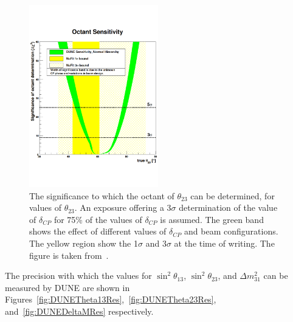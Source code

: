\begin{figure}[h!]
  \centering
  \includegraphics[width=0.5\textwidth]{DUNEOctantDetermination}
  \caption[The significance to which the octant of $\theta_{23}$ can be determined, for values of $\theta_{23}$]
          {The significance to which the octant of $\theta_{23}$ can be determined, for values of $\theta_{23}$. An exposure offering a 3$\sigma$ determination of the value of $\delta_{CP}$ for 75\% of the values of $\delta_{CP}$ is assumed. The green band shows the effect of different values of $\delta_{CP}$ and beam configurations. The yellow region show the 1$\sigma$ and 3$\sigma$ at the time of writing. The figure is taken from~\citep{DUNECDR_V2}.}
  \label{fig:DUNEOctantDetermination}
\end{figure}

The precision with which the values for $\sin^{2}\theta_{13}$, $\sin^{2}\theta_{23}$, and $\Delta m^{2}_{31}$ can be measured by DUNE are shown in Figures~\ref{fig:DUNETheta13Res},~\ref{fig:DUNETheta23Res}, and~\ref{fig:DUNEDeltaMRes} respectively. 

